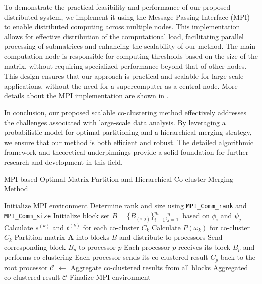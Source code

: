 \documentclass[journal]{IEEEtran}
\begin{document}
To demonstrate the practical feasibility and performance of our proposed distributed system, we implement it using the Message Passing Interface (MPI) to enable distributed computing across multiple nodes. This implementation allows for effective distribution of the computational load, facilitating parallel processing of submatrices and enhancing the scalability of our method. The main computation node is responsible for computing thresholds based on the size of the matrix, without requiring specialized performance beyond that of other nodes. This design ensures that our approach is practical and scalable for large-scale applications, without the need for a supercomputer as a central node.
More details about the MPI implementation are shown in .

In conclusion, our proposed scalable co-clustering method effectively addresses the challenges associated with large-scale data analysis. By leveraging a probabilistic model for optimal partitioning and a hierarchical merging strategy, we ensure that our method is both efficient and robust. The detailed algorithmic framework and theoretical underpinnings provide a solid foundation for further research and development in this field.

\begin{algorithm}[!t]
    \caption{MPI-based Optimal Matrix Partition and Hierarchical Co-cluster Merging Method}\label{alg:mpi_method}
    \begin{algorithmic}[1]
        \STATE Initialize MPI environment
        \STATE Determine rank and size using \texttt{MPI\_Comm\_rank} and \texttt{MPI\_Comm\_size}
        \STATE Initialize block set $B = \{B_{(i,j)}\}_{i=1}^m,_{j=1}^n$ based on $\phi_i$ and $\psi_j$
        \STATE Calculate $s^{(k)}$ and $t^{(k)}$ for each co-cluster $C_k$
        \STATE Calculate $P(\omega_k)$ for co-cluster $C_k$
        \STATE Partition matrix $\mathbf{A}$ into blocks $B$ and distribute to processors
        \STATE Send corresponding block $B_p$ to processor $p$
        \ENDFOR
        \ENDIF
        \ENDFOR
        \ENDIF
        \STATE Each processor $p$ receives its block $B_p$ and performs co-clustering
        \STATE Each processor sends its co-clustered result $C_p$ back to the root processor
        \STATE $\mathcal{C}$ $\gets$ Aggregate co-clustered results from all blocks
        \RETURN Aggregated co-clustered result $\mathcal{C}$
        \ENDIF
        \STATE Finalize MPI environment
    \end{algorithmic}
\end{algorithm}
\end{document}
